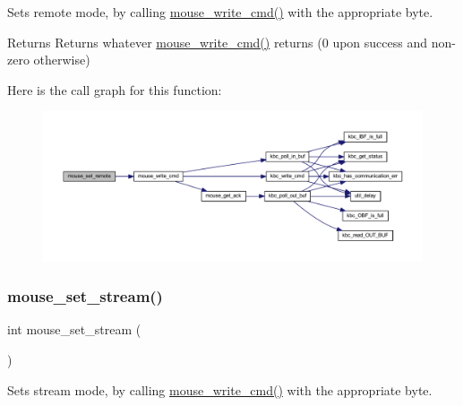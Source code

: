 Sets remote mode, by calling \mbox{\hyperlink{group__mouse_ga14261d6dca45cb7cc9c8a786739ac5a3}{mouse\+\_\+write\+\_\+cmd()}} with the appropriate byte. 

\begin{DoxyReturn}{Returns}
Returns whatever \mbox{\hyperlink{group__mouse_ga14261d6dca45cb7cc9c8a786739ac5a3}{mouse\+\_\+write\+\_\+cmd()}} returns (0 upon success and non-\/zero otherwise) 
\end{DoxyReturn}
Here is the call graph for this function\+:\nopagebreak
\begin{figure}[H]
\begin{center}
\leavevmode
\includegraphics[width=350pt]{group__mouse_ga848ca3a5a4826200866774d23c80d286_cgraph}
\end{center}
\end{figure}
\mbox{\label{group__mouse_ga7de2d644cbc4f0c10fa7888413230863}} 
\subsubsection{\texorpdfstring{mouse\+\_\+set\+\_\+stream()}{mouse\_set\_stream()}}
{\footnotesize\ttfamily int mouse\+\_\+set\+\_\+stream (\begin{DoxyParamCaption}{ }\end{DoxyParamCaption})}



Sets stream mode, by calling \mbox{\hyperlink{group__mouse_ga14261d6dca45cb7cc9c8a786739ac5a3}{mouse\+\_\+write\+\_\+cmd()}} with the appropriate byte. 

